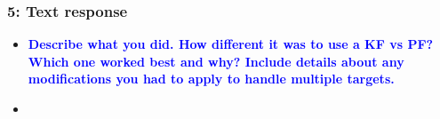 \documentclass[../report.tex]{subfiles}
\begin{document}
    \begin{frame}[t]
        \frametitle{5: Text response}
        \begin{normalsize}
            \begin{itemize}
                \setlength\itemsep{1em}\fontsize{6pt}{6pt}

                \item[]{\textbf{\selectfont\textcolor{blue}{ Describe what you did. How different it was to use a KF vs PF? Which one worked best and why? Include details about any modifications you had to apply to handle multiple targets. }}}
                
                \item[]\textbf{}
            \end{itemize}
        \end{normalsize}
    \end{frame}
\end{document}

